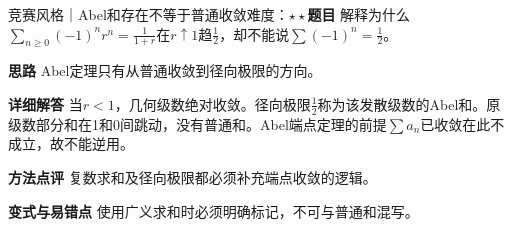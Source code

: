 \begin{example}{竞赛风格｜Abel和存在不等于普通收敛}{难度：$\star\star$}\label{deep:ex:series_source_deep:endpointtrap}\textbf{题目} 解释为什么$\sum_{n\ge0}(-1)^nr^n=\frac{1}{1+r}$在$r\uparrow1$趋$\frac{1}{2}$，却不能说$\sum(-1)^n=\frac{1}{2}$。\par\textbf{思路} Abel定理只有从普通收敛到径向极限的方向。\par\textbf{详细解答} 当$r<1$，几何级数绝对收敛。径向极限$\frac{1}{2}$称为该发散级数的Abel和。原级数部分和在1和0间跳动，没有普通和。Abel端点定理的前提$\sum a_n$已收敛在此不成立，故不能逆用。\par\textbf{方法点评} 复数求和及径向极限都必须补充端点收敛的逻辑。\par\textbf{变式与易错点} 使用广义求和时必须明确标记，不可与普通和混写。\end{example}
